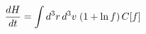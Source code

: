 \documentclass[preview]{standalone}
\begin{document}
\begin{align*}
\special{dvisvgm:raw <g id='unique000'>}\dv{H}{t}=\int d^3r\,d^3v\;(1+\ln f)\,C[f]\special{dvisvgm:raw </g>}
\end{align*}
\end{document}
